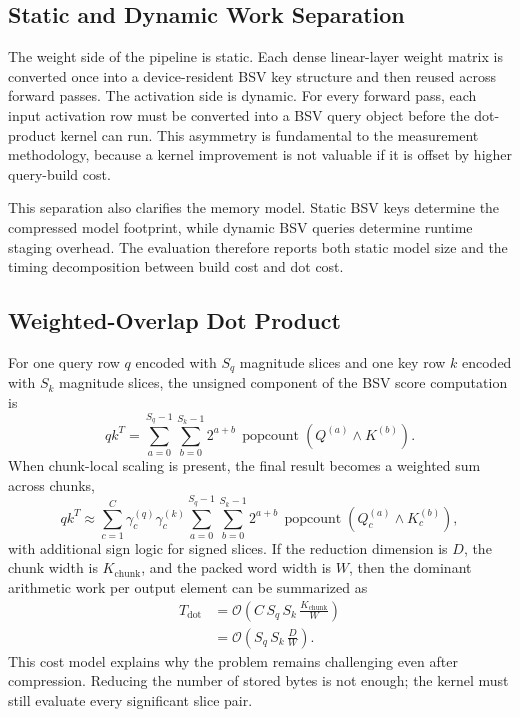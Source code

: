 \subsection{Static and Dynamic Work Separation}
The weight side of the pipeline is static. Each dense linear-layer weight matrix is converted once into a device-resident BSV key structure and then reused across forward passes. The activation side is dynamic. For every forward pass, each input activation row must be converted into a BSV query object before the dot-product kernel can run. This asymmetry is fundamental to the measurement methodology, because a kernel improvement is not valuable if it is offset by higher query-build cost.

This separation also clarifies the memory model. Static BSV keys determine the compressed model footprint, while dynamic BSV queries determine runtime staging overhead. The evaluation therefore reports both static model size and the timing decomposition between build cost and dot cost.

\subsection{Weighted-Overlap Dot Product}
For one query row $q$ encoded with $S_q$ magnitude slices and one key row $k$ encoded with $S_k$ magnitude slices, the unsigned component of the BSV score computation is
\begin{equation}
    q k^T = \sum_{a=0}^{S_q-1} \sum_{b=0}^{S_k-1} 2^{a+b} \, \operatorname{popcount}\!\left(Q^{(a)} \wedge K^{(b)}\right).
\end{equation}
When chunk-local scaling is present, the final result becomes a weighted sum across chunks,
\begin{equation}
    q k^T \approx \sum_{c=1}^{C} \gamma_c^{(q)} \gamma_c^{(k)}
    \sum_{a=0}^{S_q-1} \sum_{b=0}^{S_k-1} 2^{a+b}
    \, \operatorname{popcount}\!\left(Q_c^{(a)} \wedge K_c^{(b)}\right),
\end{equation}
with additional sign logic for signed slices. If the reduction dimension is $D$, the chunk width is $K_{\mathrm{chunk}}$, and the packed word width is $W$, then the dominant arithmetic work per output element can be summarized as
\begin{equation}
\begin{aligned}
T_{\mathrm{dot}}
    &= \mathcal{O}\!\left(C\,S_q\,S_k\,\frac{K_{\mathrm{chunk}}}{W}\right) \\
    &= \mathcal{O}\!\left(S_q\,S_k\,\frac{D}{W}\right).
\end{aligned}
\end{equation}
This cost model explains why the problem remains challenging even after compression. Reducing the number of stored bytes is not enough; the kernel must still evaluate every significant slice pair.

